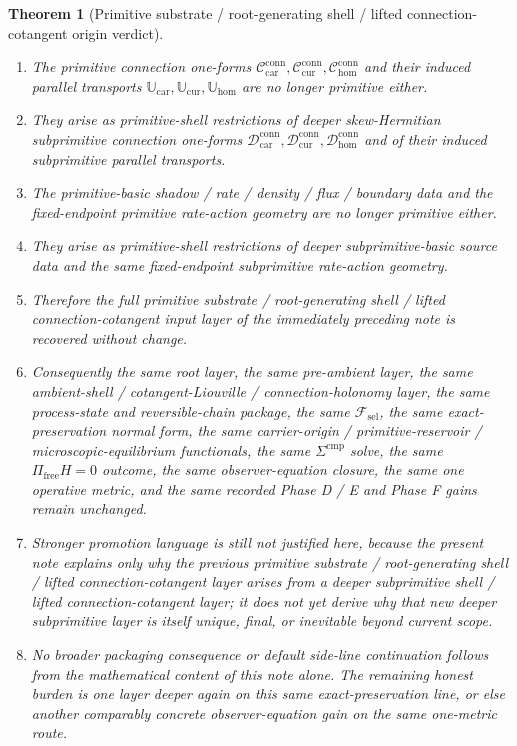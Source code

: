 \documentclass[11pt]{article}
\newcommand{\StemFunctional}{\mathscr F_{\mathrm{sel}}}
\newcommand{\TensorPrimitiveConnectionForm}{\mathcal C_{\mathrm{car}}^{\mathrm{conn}}}
\newcommand{\CurPrimitiveConnectionForm}{\mathcal C_{\mathrm{cur}}^{\mathrm{conn}}}
\newcommand{\HomPrimitiveConnectionForm}{\mathcal C_{\mathrm{hom}}^{\mathrm{conn}}}
\newcommand{\TensorPrimitiveTransport}{\mathbb U_{\mathrm{car}}}
\newcommand{\CurPrimitiveTransport}{\mathbb U_{\mathrm{cur}}}
\newcommand{\HomPrimitiveTransport}{\mathbb U_{\mathrm{hom}}}
\newcommand{\TensorSubprimitiveConnectionForm}{\mathcal D_{\mathrm{car}}^{\mathrm{conn}}}
\newcommand{\CurSubprimitiveConnectionForm}{\mathcal D_{\mathrm{cur}}^{\mathrm{conn}}}
\newcommand{\HomSubprimitiveConnectionForm}{\mathcal D_{\mathrm{hom}}^{\mathrm{conn}}}
\newtheorem{theorem}{Theorem}
\begin{document}
\begin{theorem}[Primitive substrate / root-generating shell / lifted connection-cotangent origin verdict]
\begin{enumerate}
    \item The primitive connection one-forms \(\TensorPrimitiveConnectionForm,\CurPrimitiveConnectionForm,\HomPrimitiveConnectionForm\) and their induced parallel transports \(\TensorPrimitiveTransport,\CurPrimitiveTransport,\HomPrimitiveTransport\) are no longer primitive either.
    \item They arise as primitive-shell restrictions of deeper skew-Hermitian subprimitive connection one-forms \(\TensorSubprimitiveConnectionForm,\CurSubprimitiveConnectionForm,\HomSubprimitiveConnectionForm\) and of their induced subprimitive parallel transports.
    \item The primitive-basic shadow / rate / density / flux / boundary data and the fixed-endpoint primitive rate-action geometry are no longer primitive either.
    \item They arise as primitive-shell restrictions of deeper subprimitive-basic source data and the same fixed-endpoint subprimitive rate-action geometry.
    \item Therefore the full primitive substrate / root-generating shell / lifted connection-cotangent input layer of the immediately preceding note is recovered without change.
    \item Consequently the same root layer, the same pre-ambient layer, the same ambient-shell / cotangent-Liouville / connection-holonomy layer, the same process-state and reversible-chain package, the same \(\StemFunctional\), the same exact-preservation normal form, the same carrier-origin / primitive-reservoir / microscopic-equilibrium functionals, the same \(\Sigma^{\mathrm{cmp}}\) solve, the same \(\Pi_{\mathrm{free}}H=0\) outcome, the same observer-equation closure, the same one operative metric, and the same recorded Phase D / E and Phase F gains remain unchanged.
    \item Stronger promotion language is still not justified here, because the present note explains only why the previous primitive substrate / root-generating shell / lifted connection-cotangent layer arises from a deeper subprimitive shell / lifted connection-cotangent layer; it does not yet derive why that new deeper subprimitive layer is itself unique, final, or inevitable beyond current scope.
    \item No broader packaging consequence or default side-line continuation follows from the mathematical content of this note alone. The remaining honest burden is one layer deeper again on this same exact-preservation line, or else another comparably concrete observer-equation gain on the same one-metric route.
\end{enumerate}
\end{theorem}
\end{document}
